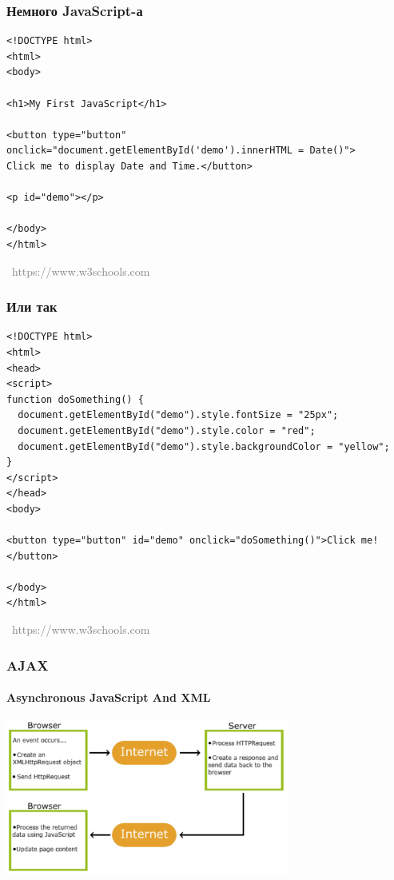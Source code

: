 \documentclass[xetex,mathserif,serif]{beamer}
\newcommand{\attribution}[1] {
\vspace{-5mm}\begin{flushright}\begin{scriptsize}\textcolor{gray}{\textcopyright\, #1}\end{scriptsize}\end{flushright}
}
\begin{document}
	\begin{frame}[fragile]
		\frametitle{Немного JavaScript-а}
		\begin{verbatim}
<!DOCTYPE html>
<html>
<body>

<h1>My First JavaScript</h1>

<button type="button"
onclick="document.getElementById('demo').innerHTML = Date()">
Click me to display Date and Time.</button>

<p id="demo"></p>

</body>
</html> 
		\end{verbatim}
		\attribution{https://www.w3schools.com}
	\end{frame}

	\begin{frame}[fragile]
		\frametitle{Или так}
		\begin{small}
			\begin{verbatim}
<!DOCTYPE html>
<html>
<head>
<script>
function doSomething() {
  document.getElementById("demo").style.fontSize = "25px";
  document.getElementById("demo").style.color = "red";
  document.getElementById("demo").style.backgroundColor = "yellow";
}
</script>
</head>
<body>

<button type="button" id="demo" onclick="doSomething()">Click me!</button>

</body>
</html>
			\end{verbatim}
		\end{small}
		\vspace{-3mm}
		\attribution{https://www.w3schools.com}
	\end{frame}

	\begin{frame}
		\frametitle{AJAX}
		\framesubtitle{Asynchronous JavaScript And XML}
		\begin{center}
			\includegraphics[width=0.7\textwidth]{ajax.png}
		\end{center}
	\end{frame}
\end{document}
